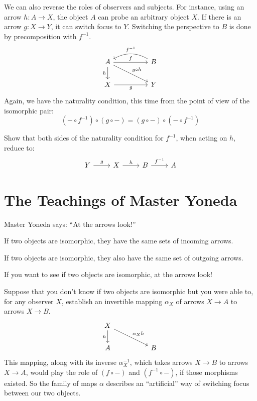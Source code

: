 \documentclass[DaoFP]{subfiles}
\begin{document}
We can also reverse the roles of observers and subjects. For instance, using an arrow $h \colon A \to X$, the object $A$ can probe an arbitrary object $X$. If there is an arrow $g \colon X \to Y$, it can switch focus to $Y$. Switching the perspective to $B$ is done by precomposition with $f^{-1}$.
\[
 \begin{tikzcd}
 A
 \arrow[rr, "f"]
 \arrow[d, "h"']
 \arrow[rrd, "g\circ h"]
 && B
  \arrow[ll, bend right,  "f^{-1}"']
 \\
 X
 \arrow[rr, "g"']
  && Y
 \end{tikzcd}
\]
Again, we have the naturality condition, this time from the point of view of the isomorphic pair:
\[(- \circ f^{-1}) \circ (g \circ -) = (g \circ -) \circ (- \circ f^{-1}) \]

\begin{exercise}
Show that both sides of the naturality condition for $f^{-1}$, when acting on $h$, reduce to:
\[
 \begin{tikzcd}
 Y \arrow[r, "g"] &X \arrow[r, "h"] & B \arrow[r, "f^{-1}"] & A
\end{tikzcd}
\]

\end{exercise}

\section{The Teachings of Master Yoneda}

Master Yoneda says: ``At the arrows look!''

If two objects are isomorphic, they have the same sets of incoming arrows. 

If two objects are isomorphic, they also have the same set of outgoing arrows.

If you want to see if two objects are isomorphic, at the arrows look!

Suppose that you don't know if two objects are isomorphic but you were able to, for any observer $X$, establish an invertible mapping $\alpha_X$ of arrows $X \to A$ to arrows $X \to B$. 
\[
 \begin{tikzcd}
 X
 \arrow[d, "h"']
 \arrow[rrd, "\alpha_X h"]
  \\
 A
  && B
 \end{tikzcd}
\]
This mapping, along with its inverse $\alpha^{-1}_X$, which takes arrows $X \to B$ to arrows $X \to A$, would play the role of $(f \circ -)$ and $(f^{-1} \circ -)$, if those morphisms existed. So the family of maps $\alpha$ describes an ``artificial'' way of switching focus between our two objects.
\end{document}
